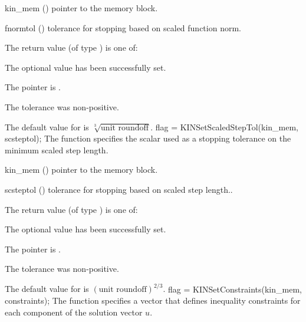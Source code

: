 {
  \begin{args}[fnormtol]
  \item[kin\_mem] ()
    pointer to the {\kinsol} memory block.
  \item[fnormtol] ()
    tolerance for stopping based on scaled function norm.
  \end{args}
}
{
  The return value  (of type ) is one of:
  \begin{args}
  \item[\Id{KIN\_SUCCESS}] 
    The optional value has been successfully set.
  \item[\Id{KIN\_MEM\_NULL}]
    The  pointer is .
  \item[\Id{KIN\_ILL\_INPUT}]
    The tolerance was non-positive.
  \end{args}
}
{
  The default value for  is $\sqrt[3]{\text{unit roundoff}}$.
}
{
flag = KINSetScaledStepTol(kin\_mem, scsteptol);
}
{
  The function  specifies the scalar used
  as a stopping tolerance on the minimum scaled step length.
}
{
  \begin{args}[scsteptol]
  \item[kin\_mem] ()
    pointer to the {\kinsol} memory block.
  \item[scsteptol] ()
    tolerance for stopping based on scaled step length.. 
  \end{args}
}
{
  The return value  (of type ) is one of:
  \begin{args}
  \item[\Id{KIN\_SUCCESS}] 
    The optional value has been successfully set.
  \item[\Id{KIN\_MEM\_NULL}]
    The  pointer is .
  \item[\Id{KIN\_ILL\_INPUT}]
    The tolerance was non-positive.
  \end{args}
}
{
  The default value for  is $(\text{unit roundoff})^{2/3}$.
}
{
flag = KINSetConstraints(kin\_mem, constraints);
}
{
  The function  specifies a vector that defines
  inequality constraints for each component of the solution vector $u$.
}
